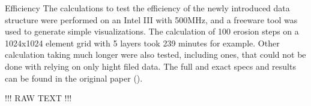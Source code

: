 Efficiency 
The calculations to test the efficiency of the newly introduced data structure were performed on an Intel III with 500MHz, and a freeware tool was used to generate simple visualizations. The calculation of 100 erosion steps on a 1024x1024 element grid with 5 layers took 239 minutes for example. Other calculation taking much longer were also tested, including ones, that could not be done with relying on only hight filed data. The full and exact specs and results can be found in the original paper ().

!!! RAW TEXT !!!